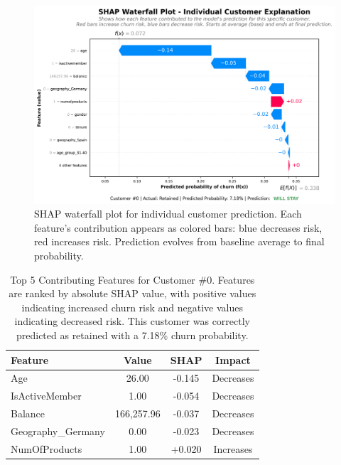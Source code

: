 \documentclass[12pt]{article}
\begin{document}
\begin{figure}[H]
\centering
\includegraphics[width=\textwidth]{../img/26_shap_waterfall.png}
\caption{SHAP waterfall plot for individual customer prediction. Each feature's contribution appears as colored bars: blue decreases risk, red increases risk. Prediction evolves from baseline average to final probability.}
\label{fig:shap_waterfall}
\end{figure}

\begin{table}[H]
\centering
\small
\caption{Top 5 Contributing Features for Customer \#0. Features are ranked by absolute SHAP value, with positive values indicating increased churn risk and negative values indicating decreased risk. This customer was correctly predicted as retained with a 7.18\% churn probability.}
\label{tab:shap_top5}
\begin{tabular}{lccc}
\toprule
\textbf{Feature} & \textbf{Value} & \textbf{SHAP} & \textbf{Impact} \\
\midrule
Age & 26.00 & -0.145 & Decreases \\
IsActiveMember & 1.00 & -0.054 & Decreases \\
Balance & 166,257.96 & -0.037 & Decreases \\
Geography\_Germany & 0.00 & -0.023 & Decreases \\
NumOfProducts & 1.00 & +0.020 & Increases \\
\bottomrule
\end{tabular}
\end{table}
\end{document}
